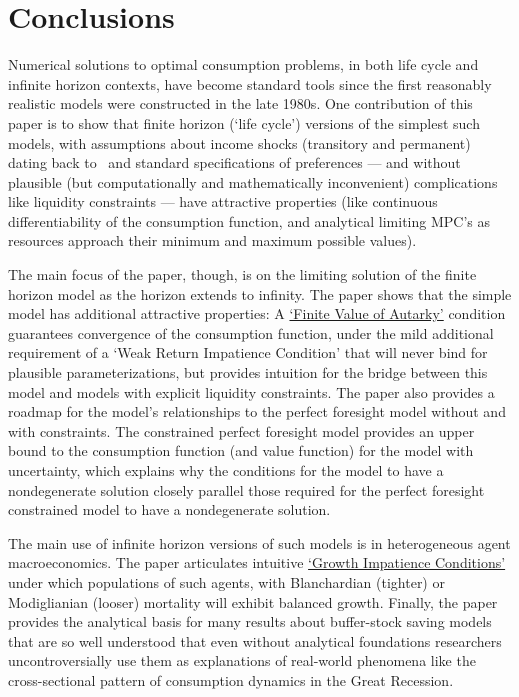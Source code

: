 \documentclass[ProjectDLO]{subfiles}
\begin{document}
\hypertarget{Conclusions}{}
\section{Conclusions}

Numerical solutions to optimal consumption problems, in both life cycle and infinite horizon contexts, have become standard tools since the first reasonably realistic models were constructed in the late 1980s. One contribution of this paper is to show that finite horizon (`life cycle') versions of the simplest such models, with assumptions about income shocks (transitory and permanent) dating back to~\cite{friedmanATheory} and standard specifications of preferences --- and without plausible (but computationally and mathematically inconvenient) complications like liquidity constraints --- have attractive properties (like continuous differentiability of the consumption function, and analytical limiting MPC's as resources approach their minimum and maximum possible values).%

The main focus of the paper, though, is on the limiting solution of the finite horizon model as the horizon extends to infinity.  The paper shows that the simple model has additional attractive properties: A \href{https://econ-ark.github.io/BufferStockTheory#FVAC}{`Finite Value of Autarky'} condition guarantees convergence of the consumption function, under the mild additional requirement of a `Weak Return Impatience Condition' that will never bind for plausible parameterizations, but provides intuition for the bridge between this model and models with explicit liquidity constraints. The paper also provides a roadmap for the model's relationships to the perfect foresight model without and with constraints.  The constrained perfect foresight model provides an upper bound to the consumption function (and value function) for the model with uncertainty, which explains why the conditions for the model to have a nondegenerate solution closely parallel those required for the perfect foresight constrained model to have a nondegenerate solution.

The main use of infinite horizon versions of such models is in heterogeneous agent macroeconomics. The paper articulates intuitive \href{https://econ-ark.github.io/BufferStockTheory#GICAgg}{`Growth Impatience Conditions'} under which populations of such agents, with Blanchardian (tighter) or Modiglianian (looser) mortality will exhibit balanced growth.  Finally, the paper provides the analytical basis for many results about buffer-stock saving models that are so well understood that even without analytical foundations researchers uncontroversially use them as explanations of real-world phenomena like the cross-sectional pattern of consumption dynamics in the Great Recession.
\end{document}

